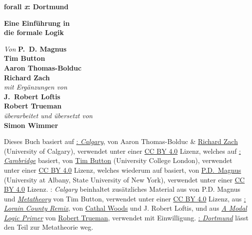 
\pagestyle{empty}

\vspace*{80pt}

\begin{raggedleft}
\fontsize{30pt}{24pt}\sffamily
\selectfont
  \textbf{forall 
  {\fontsize{37pt}{24pt}\selectfont\rmfamily\textit{x}}: 
  Dortmund}

\medskip\fontsize{18pt}{20pt}\selectfont

\textbf{Eine Einführung in\\ die formale Logik}

\vfill
\fontsize{12pt}{16pt}\selectfont \textit{Von } \textbf{P.~D. Magnus}\\
\textbf{Tim Button}\\
\textbf{Aaron Thomas-Bolduc}\\ 
\textbf{Richard Zach}\\
\textit{mit Ergänzungen von}\\
\textbf{J.~Robert Loftis}\\
\textbf{Robert Trueman}\\
\textit{überarbeitet und übersetzt von}\\
\textbf{Simon Wimmer}


\vfill
\textbf{\forallxversion}\par
\end{raggedleft}


\newpage


\noindent\small%
Dieses Buch basiert auf \href{http://forallx.openlogicproject.org/}{\forallx: \emph{Calgary}}, von Aaron Thomas-Bolduc \& \href{https://richardzach.org/}{Richard Zach} (University of Calgary), verwendet unter einer \href{https://creativecommons.org/licenses/by/4.0/}{CC BY 4.0} Lizenz, welches auf \href{http://www.homepages.ucl.ac.uk/~uctytbu/OERs.html}{\forallx: \emph{Cambridge}} basiert, von \href{http://nottub.com/}{Tim Button} (University College London), verwendet unter einer \href{https://creativecommons.org/licenses/by/4.0/}{CC BY 4.0} Lizenz, welches wiederum auf \href{https://www.fecundity.com/logic/}{\forallx} basiert, von \href{https://www.fecundity.com/job/}{P.D.\ Magnus} (University at Albany, State University of New York), verwendet unter einer \href{https://creativecommons.org/licenses/by/4.0/}{CC BY 4.0} Lizenz.
\forallx: \emph{Calgary} beinhaltet zusätzliches Material aus \forallx{} von P.D. Magnus und \href{http://people.ds.cam.ac.uk/tecb2/metatheory.shtml}{\emph{Metatheory}} von Tim Button, 
verwendet unter einer \href{https://creativecommons.org/licenses/by/4.0/}{CC BY 4.0} Lizenz, 
aus \href{https://github.com/rob-helpy-chalk/openintroduction}{\forallx: \emph{Lorain
County Remix}}, von \href{https://sites.google.com/site/cathalwoods/}{Cathal Woods} und J. Robert Loftis, und aus \href{http://www.rtrueman.com/uploads/7/0/3/2/70324387/modal_logic_primer.pdf}{\emph{A Modal Logic Primer}} von \href{http://www.rtrueman.com/}{Robert Trueman}, verwendet mit Einwilligung. \href{https://github.com/sbwimmer/forallx-do}{\forallx: \emph{Dortmund}} lässt den Teil zur Metatheorie weg.

